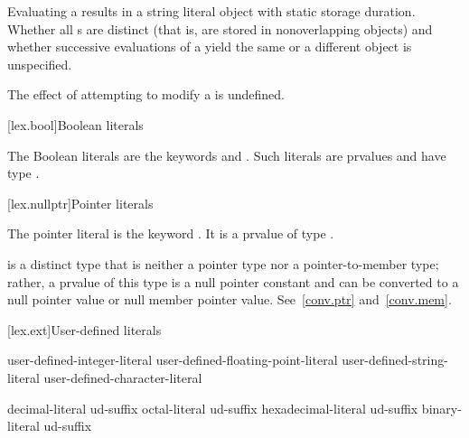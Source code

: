 \documentclass{wg21}
\begin{document}
\pnum
Evaluating a  results in a string literal object
with static storage duration.
%
Whether all s are distinct (that is, are stored in
nonoverlapping objects) and whether successive evaluations of a
 yield the same or a different object is
unspecified.
\begin{note}
    The effect of attempting to modify a  is undefined.
\end{note}

[lex.bool]{Boolean literals}

%
\begin{bnf}
    \br
    \br
\end{bnf}

\pnum
{}%
The Boolean literals are the keywords  and .
Such literals are prvalues and have type .

[lex.nullptr]{Pointer literals}

%
\begin{bnf}
    \br
\end{bnf}

\pnum
The pointer literal is the keyword . It is a prvalue of type
.
\begin{note}
     is a distinct type that is neither a pointer type nor a pointer-to-member type;
    rather, a prvalue of this type is a null pointer constant and can be
    converted to a null pointer value or null member pointer value. See~\ref{conv.ptr}
    and~\ref{conv.mem}.
\end{note}

[lex.ext]{User-defined literals}

%
\begin{bnf}
    \br
    user-defined-integer-literal\br
    user-defined-floating-point-literal\br
    user-defined-string-literal\br
    user-defined-character-literal
\end{bnf}

\begin{bnf}
    \br
    decimal-literal ud-suffix\br
    octal-literal ud-suffix\br
    hexadecimal-literal ud-suffix\br
    binary-literal ud-suffix
\end{bnf}
\end{document}
